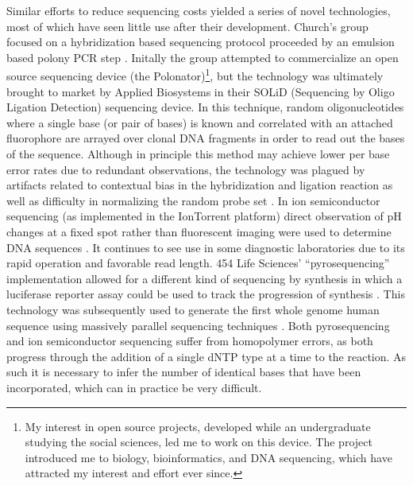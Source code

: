 Similar efforts to reduce sequencing costs yielded a series of novel technologies, most of which have seen little use after their development.
Church's group focused on a hybridization based sequencing protocol proceeded by an emulsion based polony PCR step \cite{shendure2005accurate}.
Initally the group attempted to commercialize an open source sequencing device (the Polonator)\footnote{My interest in open source projects, developed while an undergraduate studying the social sciences, led me to work on this device. The project introduced me to biology, bioinformatics, and DNA sequencing, which have attracted my interest and effort ever since.}, but the technology was ultimately brought to market by Applied Biosystems in their SOLiD (Sequencing by Oligo Ligation Detection) sequencing device.
In this technique, random oligonucleotides where a single base (or pair of bases) is known and correlated with an attached fluorophore are arrayed over clonal DNA fragments in order to read out the bases of the sequence.
Although in principle this method may achieve lower per base error rates due to redundant observations, the technology was plagued by artifacts related to contextual bias in the hybridization and ligation reaction as well as difficulty in normalizing the random probe set \cite{challis2015distribution}.
In ion semiconductor sequencing (as implemented in the IonTorrent platform) direct observation of pH changes at a fixed spot rather than fluorescent imaging were used to determine DNA sequences \cite{rusk2010torrents}.
It continues to see use in some diagnostic laboratories due to its rapid operation and favorable read length.
454 Life Sciences' ``pyrosequencing'' implementation allowed for a different kind of sequencing by synthesis in which a luciferase reporter assay could be used to track the progression of synthesis \cite{margulies2005genome}.
This technology was subsequently used to generate the first whole genome human sequence using massively parallel sequencing techniques \cite{wheeler2008complete}.
Both pyrosequencing and ion semiconductor sequencing suffer from homopolymer errors, as both progress through the addition of a single dNTP type at a time to the reaction.
As such it is necessary to infer the number of identical bases that have been incorporated, which can in practice be very difficult.


